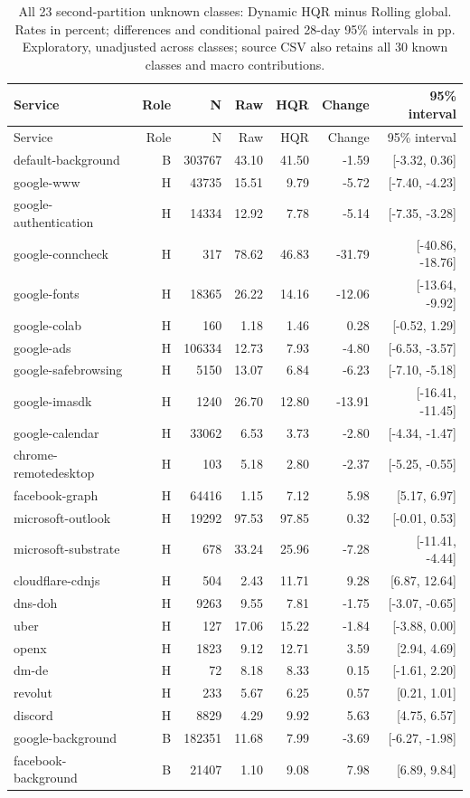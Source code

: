 \begingroup\small\setlength{\tabcolsep}{3pt}
\begin{longtable}{lrrrrrr}
\caption{All 23 second-partition unknown classes: Dynamic HQR minus Rolling global. Rates in percent; differences and conditional paired 28-day 95\% intervals in pp. Exploratory, unadjusted across classes; source CSV also retains all 30 known classes and macro contributions.}\label{tab:final-second-classes}\\
\toprule
Service & Role & N & Raw & HQR & Change & 95\% interval\\
\midrule
\endfirsthead
\toprule
Service & Role & N & Raw & HQR & Change & 95\% interval\\
\midrule
\endhead
default-background & B & 303767 & 43.10 & 41.50 & -1.59 & [-3.32, 0.36]\\
google-www & H & 43735 & 15.51 & 9.79 & -5.72 & [-7.40, -4.23]\\
google-authentication & H & 14334 & 12.92 & 7.78 & -5.14 & [-7.35, -3.28]\\
google-conncheck & H & 317 & 78.62 & 46.83 & -31.79 & [-40.86, -18.76]\\
google-fonts & H & 18365 & 26.22 & 14.16 & -12.06 & [-13.64, -9.92]\\
google-colab & H & 160 & 1.18 & 1.46 & 0.28 & [-0.52, 1.29]\\
google-ads & H & 106334 & 12.73 & 7.93 & -4.80 & [-6.53, -3.57]\\
google-safebrowsing & H & 5150 & 13.07 & 6.84 & -6.23 & [-7.10, -5.18]\\
google-imasdk & H & 1240 & 26.70 & 12.80 & -13.91 & [-16.41, -11.45]\\
google-calendar & H & 33062 & 6.53 & 3.73 & -2.80 & [-4.34, -1.47]\\
chrome-remotedesktop & H & 103 & 5.18 & 2.80 & -2.37 & [-5.25, -0.55]\\
facebook-graph & H & 64416 & 1.15 & 7.12 & 5.98 & [5.17, 6.97]\\
microsoft-outlook & H & 19292 & 97.53 & 97.85 & 0.32 & [-0.01, 0.53]\\
microsoft-substrate & H & 678 & 33.24 & 25.96 & -7.28 & [-11.41, -4.44]\\
cloudflare-cdnjs & H & 504 & 2.43 & 11.71 & 9.28 & [6.87, 12.64]\\
dns-doh & H & 9263 & 9.55 & 7.81 & -1.75 & [-3.07, -0.65]\\
uber & H & 127 & 17.06 & 15.22 & -1.84 & [-3.88, 0.00]\\
openx & H & 1823 & 9.12 & 12.71 & 3.59 & [2.94, 4.69]\\
dm-de & H & 72 & 8.18 & 8.33 & 0.15 & [-1.61, 2.20]\\
revolut & H & 233 & 5.67 & 6.25 & 0.57 & [0.21, 1.01]\\
discord & H & 8829 & 4.29 & 9.92 & 5.63 & [4.75, 6.57]\\
google-background & B & 182351 & 11.68 & 7.99 & -3.69 & [-6.27, -1.98]\\
facebook-background & B & 21407 & 1.10 & 9.08 & 7.98 & [6.89, 9.84]\\
\bottomrule
\end{longtable}
\endgroup
